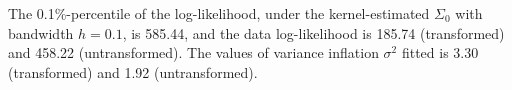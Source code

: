 The 0.1\%-percentile of the log-likelihood, under the kernel-estimated $\Sigma_0$ with bandwidth $h=0.1$, is 585.44, and the data log-likelihood is 185.74 (transformed) and 458.22 (untransformed). The values of variance inflation $\sigma^2$ fitted is 3.30 (transformed) and 1.92 (untransformed).%